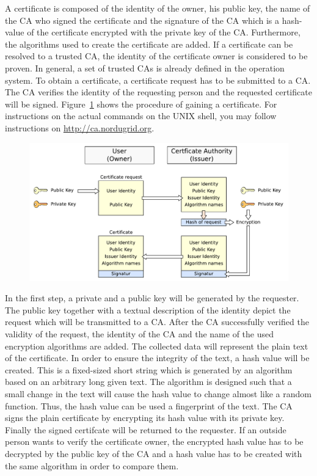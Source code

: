 A certificate is composed of the identity of the owner, his public key, the name of the CA who signed the certificate and the signature of the CA which is a hash-value of the certificate encrypted with the private key of the CA. 
Furthermore, the algorithms used to create the certificate are added.
If a certificate can be resolved to a trusted CA, the identity of the certificate owner is considered to be proven. 
In general, a set of trusted CAs is already defined in the operation system.
To obtain a certificate, a certificate request has to be submitted to a CA.
The CA verifies the identity of the requesting person and the requested certificate will be signed.
Figure~\ref{fig:certificate_request} shows the procedure of gaining a certificate.
For instructions on the actual commands on the UNIX shell, you may follow instructions on \url{http://ca.nordugrid.org}.
\begin{figure}[htb]
	\centering%
 	\includegraphics[width=13cm]{tex_tls_echoservice/certificates.pdf}
	\label{fig:certificate_request}
\end{figure}
In the first step, a private and a public key will be generated by the requester.
The public key together with a textual description of the identity depict the request which will be transmitted to a CA.
After the CA successfully verified the validity of the request, the identity of the CA and the name of the used encryption algorithms are added.
The collected data will represent the plain text of the certificate.
In order to ensure the integrity of the text, a hash value will be created.
This is a fixed-sized short string which is generated by an algorithm based on an arbitrary long given text.
The algorithm is designed such that a small change in the text will cause the hash value to change almost like a random function.
Thus, the hash value can be used a fingerprint of the text.
The CA signs the plain certificate by encrypting its hash value with its private key.
Finally the signed certifcate will be returned to the requester.
If an outside person wants to verify the certificate owner, the encrypted hash value has to be decrypted by the public key of the CA and a hash value has to be created with the same algorithm in order to compare them.\\


